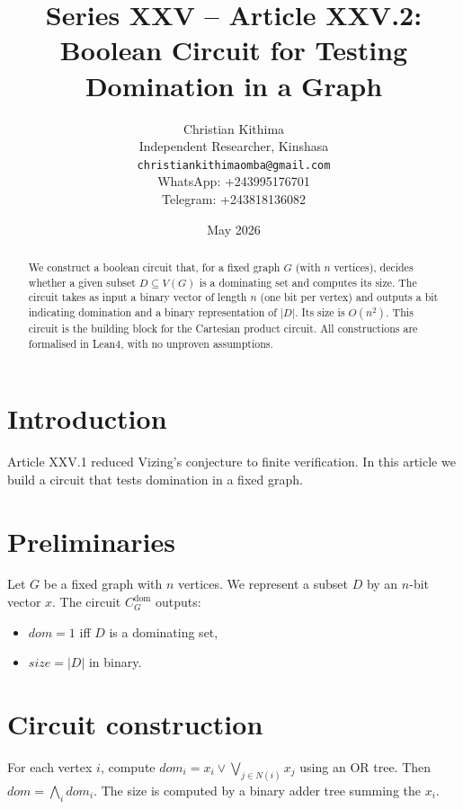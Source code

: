 \documentclass[11pt,a4paper]{article}
\title{Series XXV – Article XXV.2: Boolean Circuit for Testing Domination in a Graph}
\author{Christian Kithima \\
Independent Researcher, Kinshasa \\
\texttt{christiankithimaomba@gmail.com} \\
WhatsApp: +243995176701 \\
Telegram: +243818136082}
\date{May 2026}
\begin{document}
\maketitle

\begin{abstract}
We construct a boolean circuit that, for a fixed graph $G$ (with $n$ vertices), decides whether a given subset $D\subseteq V(G)$ is a dominating set and computes its size. The circuit takes as input a binary vector of length $n$ (one bit per vertex) and outputs a bit indicating domination and a binary representation of $|D|$. Its size is $O(n^2)$. This circuit is the building block for the Cartesian product circuit. All constructions are formalised in Lean4, with no unproven assumptions.
\end{abstract}

\tableofcontents

\section{Introduction}
Article XXV.1 reduced Vizing's conjecture to finite verification. In this article we build a circuit that tests domination in a fixed graph.

\section{Preliminaries}
Let $G$ be a fixed graph with $n$ vertices. We represent a subset $D$ by an $n$-bit vector $x$. The circuit $C_G^{\text{dom}}$ outputs:
\begin{itemize}
\item $dom = 1$ iff $D$ is a dominating set,
\item $size = |D|$ in binary.
\end{itemize}

\section{Circuit construction}
For each vertex $i$, compute $dom_i = x_i \lor \bigvee_{j\in N(i)} x_j$ using an OR tree. Then $dom = \bigwedge_i dom_i$. The size is computed by a binary adder tree summing the $x_i$.
\end{document}
